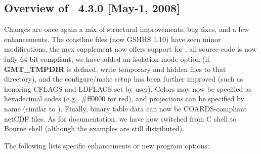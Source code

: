 \subsection{Overview of \gmt\ 4.3.0 [May-1, 2008]}

Changes are once again a mix of structural improvements, bug fixes, and a few enhancements.
The coastline files (now GSHHS 1.10) have seen minor modifications, the mex supplement now offers
support for , all source code is now fully
64-bit compliant, we have added an isolation mode option (if \textbf{GMT\_TMPDIR} is defined, write
temporary and hidden files to that directory),
and the configure/make setup has been further improved (such as honoring CFLAGS and LDFLAGS set by user).
Colors may now be specified
as hexadecimal codes (e.g., \#ff0000 for red), and projections can be specified by name
(similar to ).  Finally, binary table
data can now be COARDS-compliant netCDF files. As for documentation, we have now switched from
C shell to Bourne shell (although the  examples are still distributed).

The following lists specific enhancements or new program options:

